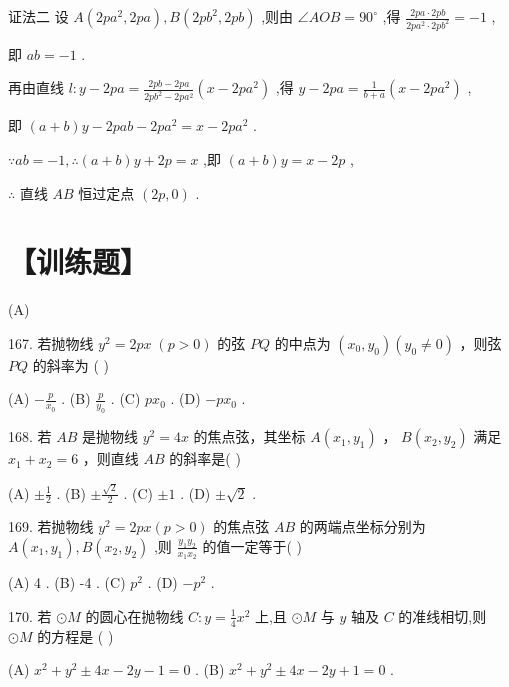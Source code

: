 \documentclass[10pt]{article}
\begin{document}
证法二 设 \(A\left( {{2p}{a}^{2},{2pa}}\right) ,B\left( {{2p}{b}^{2},{2pb}}\right)\) ,则由 \(\angle {AOB} = {90}^{ \circ  }\) ,得 \(\frac{{2pa} \cdot  {2pb}}{{2p}{a}^{2} \cdot  {2p}{b}^{2}} =  - 1\) ,

即 \({ab} =  - 1\) .

再由直线 \(l : y - {2pa} = \frac{{2pb} - {2pa}}{{2p}{b}^{2} - {2p}{a}^{2}}\left( {x - {2p}{a}^{2}}\right)\) ,得 \(y - {2pa} = \frac{1}{b + a}\left( {x - {2p}{a}^{2}}\right)\) ,

即 \(\left( {a + b}\right) y - {2pab} - {2p}{a}^{2} = x - {2p}{a}^{2}\) .

\(\because {ab} =  - 1,\therefore \left( {a + b}\right) y + {2p} = x\) ,即 \(\left( {a + b}\right) y = x - {2p}\) ,

\(\therefore\) 直线 \({AB}\) 恒过定点 \(\left( {{2p},0}\right)\) .

\section*{【训练题】}

(A)

167. 若抛物线 \({y}^{2} = {2px}\;\left( {p > 0}\right)\) 的弦 \({PQ}\) 的中点为 \(\left( {{x}_{0},{y}_{0}}\right) \left( {{y}_{0} \neq  0}\right)\) ，则弦 \({PQ}\) 的斜率为 ( )

(A) \(- \frac{p}{{x}_{0}}\) . (B) \(\frac{p}{{y}_{0}}\) . (C) \(p{x}_{0}\) . (D) \(- p{x}_{0}\) .

168. 若 \({AB}\) 是抛物线 \({y}^{2} = {4x}\) 的焦点弦，其坐标 \(A\left( {{x}_{1},{y}_{1}}\right)\) ， \(B\left( {{x}_{2},{y}_{2}}\right)\) 满足 \({x}_{1} + {x}_{2} = 6\) ，则直线 \({AB}\) 的斜率是( )

(A) \(\pm  \frac{1}{2}\) . (B) \(\pm  \frac{\sqrt{2}}{2}\) . (C) \(\pm  1\) . (D) \(\pm  \sqrt{2}\) .

169. 若抛物线 \({y}^{2} = {2px}\left( {p > 0}\right)\) 的焦点弦 \({AB}\) 的两端点坐标分别为 \(A\left( {{x}_{1},{y}_{1}}\right) ,B\left( {{x}_{2},{y}_{2}}\right)\) ,则 \(\frac{{y}_{1}{y}_{2}}{{x}_{1}{x}_{2}}\) 的值一定等于( )

(A) 4 . (B) -4 . (C) \({p}^{2}\) . (D) \(- {p}^{2}\) .

170. 若 \(\odot  M\) 的圆心在抛物线 \(C : y = \frac{1}{4}{x}^{2}\) 上,且 \(\odot  M\) 与 \(y\) 轴及 \(C\) 的准线相切,则 \(\odot  M\) 的方程是 ( )

(A) \({x}^{2} + {y}^{2} \pm  {4x} - {2y} - 1 = 0\) . (B) \({x}^{2} + {y}^{2} \pm  {4x} - {2y} + 1 = 0\) .
\end{document}
